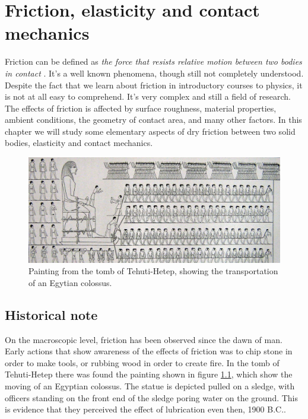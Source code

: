 \documentclass[twoside,english]{uiofysmaster}
\begin{document}
\chapter{Friction, elasticity and contact mechanics}
Friction can be defined as \textit{the force that resists relative motion between two bodies in contact} \cite{frictionDefinition}. 
It's a well known phenomena, though still not completely understood.
Despite the fact that we learn about friction in introductory courses to physics, it is not at all easy to comprehend. 
It's very complex and still a field of research.
The effects of friction is affected by surface roughness, material properties, ambient conditions, the geometry of contact area, and many other factors. 
In this chapter we will study some elementary aspects of dry friction between two solid bodies, elasticity and contact mechanics. 
   
 
\begin{figure}[H]
	\centering
	\includegraphics[width=0.99\linewidth]{figures/friction/Colossus.jpg}
	\caption{Painting from the tomb of Tehuti-Hetep, showing the transportation of an Egytian colossus.}
	\label{fig:Colossus}
\end{figure}
\section{Historical note}
On the macroscopic level, friction has been observed since the dawn of man. 
Early actions that show awareness of the effects of friction was to chip stone in order to make tools, or rubbing wood in order to create fire. 
In the tomb of Tehuti-Hetep there was found the painting shown in figure \ref{fig:Colossus}, which show the moving of an Egyptian colossus. 
The statue is depicted pulled on a sledge, with officers standing on the front end of the sledge poring water on the ground. 
This is evidence that they perceived the effect of lubrication even then, 1900 B.C..   
\end{document}
